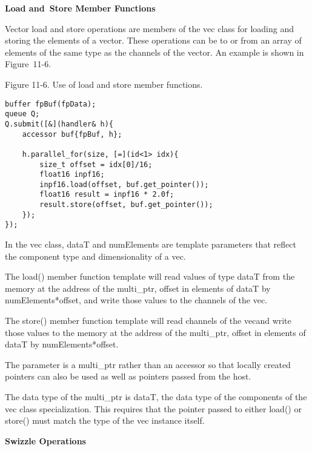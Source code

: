 \hspace*{\fill} \par %
\textbf{Load and Store Member Functions}

Vector load and store operations are members of the vec class for loading and storing the elements of a vector. These operations can be to or from an array of elements of the same type as the channels of the vector. An example is shown in Figure 11-6.\par

\hspace*{\fill} \par %
Figure 11-6. Use of load and store member functions.
\begin{lstlisting}[caption={}]
buffer fpBuf(fpData);
queue Q;
Q.submit([&](handler& h){
	accessor buf{fpBuf, h};
	
	h.parallel_for(size, [=](id<1> idx){
		size_t offset = idx[0]/16;
		float16 inpf16;
		inpf16.load(offset, buf.get_pointer());
		float16 result = inpf16 * 2.0f;
		result.store(offset, buf.get_pointer());
	});
});
\end{lstlisting}

In the vec class, dataT and numElements are template parameters that reflect the component type and dimensionality of a vec.\par

The load() member function template will read values of type dataT from the memory at the address of the multi\_ptr, offset in elements of dataT by numElements*offset, and write those values to the channels of the vec.\par

The store() member function template will read channels of the vecand write those values to the memory at the address of the multi\_ptr, offset in elements of dataT by numElements*offset.\par

The parameter is a multi\_ptr rather than an accessor so that locally created pointers can also be used as well as pointers passed from the host.\par

The data type of the multi\_ptr is dataT, the data type of the components of the vec class specialization. This requires that the pointer passed to either load() or store() must match the type of the vec instance itself.\par

\hspace*{\fill} \par %
\textbf{Swizzle Operations}

